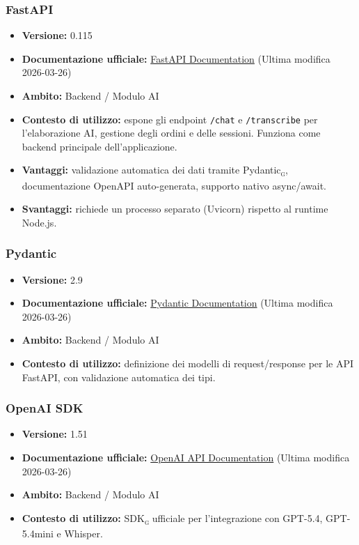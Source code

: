 \documentclass[a4paper, 11pt, oneside]{scrartcl}
\begin{document}
\subsubsection{FastAPI}
\begin{itemize}[noitemsep]
\item \textbf{Versione:} 0.115
\item \textbf{Documentazione ufficiale:} \href{https://fastapi.tiangolo.com/}{FastAPI Documentation} (Ultima modifica 2026-03-26)
\item \textbf{Ambito:} Backend / Modulo AI
\item \textbf{Contesto di utilizzo:} espone gli endpoint \texttt{/chat} e \texttt{/transcribe} per l'elaborazione AI, gestione degli ordini e delle sessioni. Funziona come backend principale dell’applicazione.
\item \textbf{Vantaggi:} validazione automatica dei dati tramite Pydantic\textsubscript{\textsc{g}}, documentazione OpenAPI auto-generata, supporto nativo async/await.
\item \textbf{Svantaggi:} richiede un processo separato (Uvicorn) rispetto al runtime Node.js.
\end{itemize}

\subsubsection{Pydantic}
\begin{itemize}[noitemsep]
\item \textbf{Versione:} 2.9
\item \textbf{Documentazione ufficiale:} \href{https://docs.pydantic.dev/latest/}{Pydantic Documentation} (Ultima modifica 2026-03-26)
\item \textbf{Ambito:} Backend / Modulo AI
\item \textbf{Contesto di utilizzo:} definizione dei modelli di request/response per le API FastAPI, con validazione automatica dei tipi.
\end{itemize}

\subsubsection{OpenAI SDK}
\begin{itemize}[noitemsep]
\item \textbf{Versione:} 1.51
\item \textbf{Documentazione ufficiale:} \href{https://platform.openai.com/docs}{OpenAI API Documentation} (Ultima modifica 2026-03-26)
\item \textbf{Ambito:} Backend / Modulo AI
\item \textbf{Contesto di utilizzo:} SDK\textsubscript{\textsc{g}} ufficiale per l'integrazione con GPT-5.4, GPT-5.4mini e Whisper.
\end{itemize}
\end{document}
